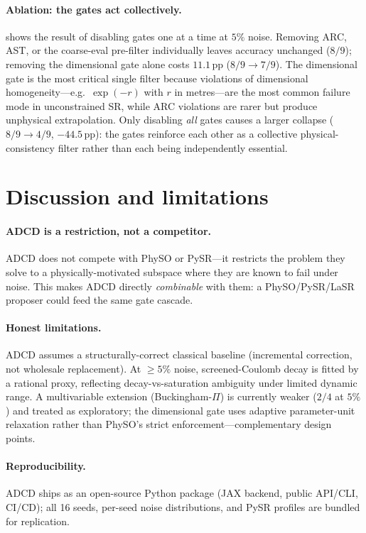 \documentclass{article}
\begin{document}
\paragraph{Ablation: the gates act collectively.}
 shows the result of disabling gates one at a time at $5\%$ noise. Removing ARC, AST, or the coarse-eval pre-filter individually leaves accuracy unchanged ($8/9$); removing the dimensional gate alone costs $11.1$\,pp ($8/9\to7/9$). The dimensional gate is the most critical single filter because violations of dimensional homogeneity---e.g.\ $\exp(-r)$ with $r$ in metres---are the most common failure mode in unconstrained SR, while ARC violations are rarer but produce unphysical extrapolation. Only disabling \emph{all} gates causes a larger collapse ($8/9\to4/9$, $-44.5$\,pp): the gates reinforce each other as a collective physical-consistency filter rather than each being independently essential.

\section{Discussion and limitations}
\label{sec:disc}

\paragraph{ADCD is a restriction, not a competitor.}
ADCD does not compete with PhySO or PySR---it restricts the problem they solve to a physically-motivated subspace where they are known to fail under noise. This makes ADCD directly \emph{combinable} with them: a PhySO/PySR/LaSR~\cite{grayeli2024lasr} proposer could feed the same gate cascade.

\paragraph{Honest limitations.}
ADCD assumes a structurally-correct classical baseline (incremental correction, not wholesale replacement). At $\geq5\%$ noise, screened-Coulomb decay is fitted by a rational proxy, reflecting decay-vs-saturation ambiguity under limited dynamic range. A multivariable extension (Buckingham-$\Pi$) is currently weaker ($2/4$ at $5\%$) and treated as exploratory; the dimensional gate uses adaptive parameter-unit relaxation rather than PhySO's strict enforcement---complementary design points.

\paragraph{Reproducibility.}
ADCD ships as an open-source Python package (JAX backend, public API/CLI, CI/CD); all 16 seeds, per-seed noise distributions, and PySR profiles are bundled for replication.
\end{document}
